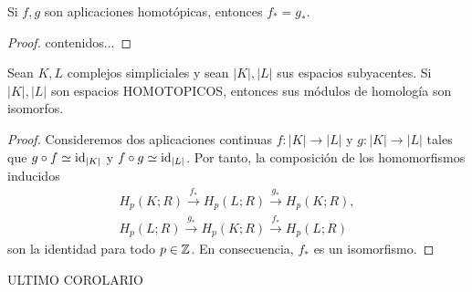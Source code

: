\begin{teorema}
	Si $f,g$ son aplicaciones homotópicas, entonces $f_*=g_*$.
\end{teorema}
\begin{proof}
	contenidos...
\end{proof}
\begin{corolario}
	Sean $K,L$ complejos simpliciales y sean $|K|,|L|$ sus espacios subyacentes. Si $|K|,|L|$ son espacios HOMOTOPICOS, entonces sus módulos de homología son isomorfos.
\end{corolario}
\begin{proof}
	Consideremos dos aplicaciones continuas $f: |K| \to |L|$ y $g: |K| \to |L|$ tales que $g \circ f \simeq \operatorname{id}_{|K|}$ y $f \circ g \simeq \operatorname{id}_{|L|}$. Por tanto, la composición de los homomorfismos inducidos
	\begin{gather*}
		H_p(K;R) \overset{f_*}{\to} H_p(L;R) \overset{g_*}{\to} H_p(K;R), \\
		H_p(L;R) \overset{g_*}{\to} H_p(K;R) \overset{f_*}{\to} H_p(L;R)
	\end{gather*}
	son la identidad para todo $p \in \mathbb{Z}$. En consecuencia, $f_*$ es un isomorfismo.
\end{proof}
ULTIMO COROLARIO

\endinput
